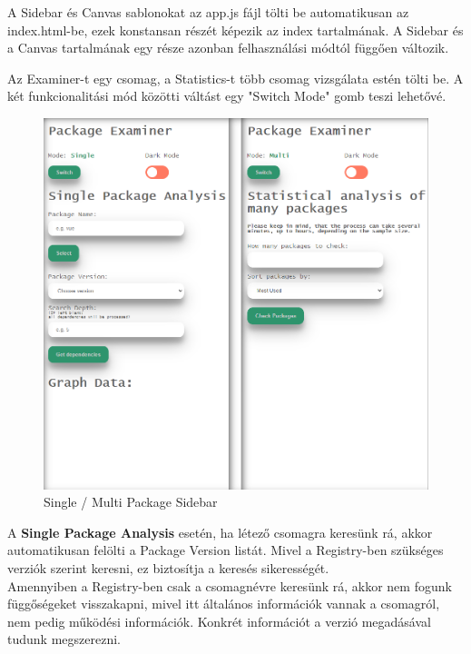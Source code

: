 A Sidebar és Canvas sablonokat az app.js fájl tölti be automatikusan az index.html-be, ezek konstansan részét képezik az index tartalmának. A Sidebar és a Canvas tartalmának egy része azonban felhasználási módtól függően változik.

Az Examiner-t egy csomag, a Statistics-t több csomag vizsgálata estén tölti be. A két funkcionalitási mód közötti váltást egy "Switch Mode" gomb teszi lehetővé.\\

\begin{figure}[!h]
	\centering
	\includegraphics[scale=0.2]{images/ui_modes.png}
	\caption{Single / Multi Package Sidebar}
	\label{fig:ui_modes}
\end{figure}

\pagebreak


A \textbf{Single Package Analysis} esetén, ha létező csomagra keresünk rá, akkor automatikusan felölti a Package Version listát. Mivel a Registry-ben szükséges verziók szerint keresni, ez biztosítja a keresés sikerességét.\\

Amennyiben a Registry-ben csak a csomagnévre keresünk rá, akkor nem fogunk függőségeket visszakapni, mivel itt általános információk vannak a csomagról, nem pedig működési információk. Konkrét információt a verzió megadásával tudunk megszerezni.\\

